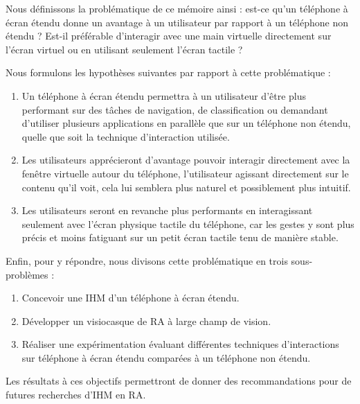 Nous définissons la problématique de ce mémoire ainsi : est-ce qu'un téléphone à écran étendu donne un avantage à un utilisateur par rapport à un téléphone non étendu ? Est-il préférable d'interagir avec une main virtuelle directement sur l'écran virtuel ou en utilisant seulement l'écran tactile ?

Nous formulons les hypothèses suivantes par rapport à cette problématique :
\begin{enumerate}[label={(H\arabic*)}]
  \item Un téléphone à écran étendu permettra à un utilisateur d'être plus performant sur des tâches de navigation, de classification ou demandant d'utiliser plusieurs applications en parallèle que sur un téléphone non étendu, quelle que soit la technique d'interaction utilisée.
  \item Les utilisateurs apprécieront d'avantage pouvoir interagir directement avec la fenêtre virtuelle autour du téléphone, l'utilisateur agissant directement sur le contenu qu'il voit, cela lui semblera plus naturel et possiblement plus intuitif.
  \item Les utilisateurs seront en revanche plus performants en interagissant seulement avec l'écran physique tactile du téléphone, car les gestes y sont plus précis et moins fatiguant sur un petit écran tactile tenu de manière stable.
\end{enumerate}
\medskip
 
Enfin, pour y répondre, nous divisons cette problématique en trois sous-problèmes :
\begin{enumerate}
  \item Concevoir une IHM d'un téléphone à écran étendu.
  \item Développer un visiocasque de RA à large champ de vision.
  \item Réaliser une expérimentation évaluant différentes techniques d'interactions sur téléphone à écran étendu comparées à un téléphone non étendu.
\end{enumerate}
\medskip

Les résultats à ces objectifs permettront de donner des recommandations pour de futures recherches d'IHM en RA.